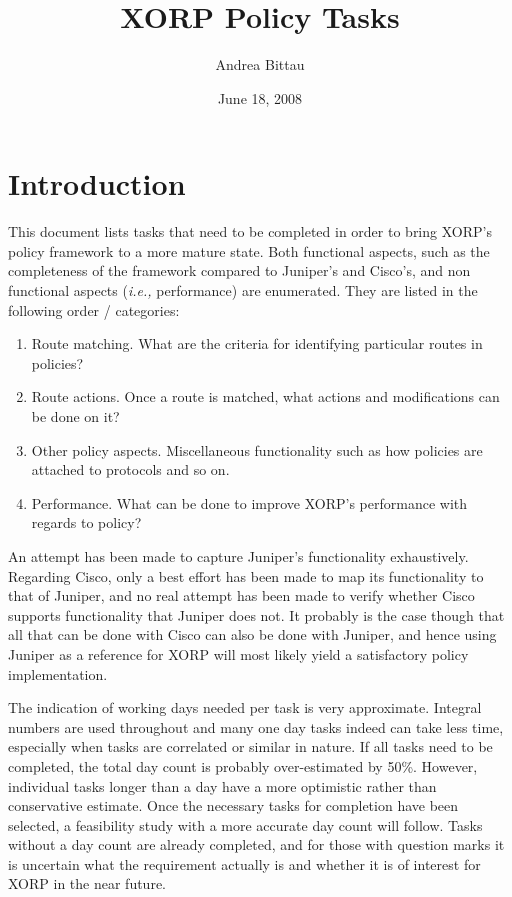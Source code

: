 \documentclass[letterpaper]{article}
\author{Andrea Bittau}
\title{XORP Policy Tasks}
\date{June 18, 2008}
\begin{document}
\maketitle

\section{Introduction}
This document lists tasks that need to be completed in order to bring XORP's
policy framework to a more mature state.  Both functional aspects, such as the
completeness of the framework compared to Juniper's and Cisco's, and non
functional aspects ({\em i.e.,} performance) are enumerated.  They are listed in
the following order / categories:
\begin{enumerate}
\item Route matching.  What are the criteria for identifying particular routes
in policies?

\item Route actions.  Once a route is matched, what actions and modifications
can be done on it?

\item Other policy aspects.  Miscellaneous functionality such as how policies
are attached to protocols and so on.

\item Performance.  What can be done to improve XORP's performance with regards
to policy?
\end{enumerate}

An attempt has been made to capture Juniper's functionality exhaustively.
Regarding Cisco, only a best effort has been made to map its functionality to
that of Juniper, and no real attempt has been made to verify whether Cisco
supports functionality that Juniper does not.  It probably is the case though
that all that can be done with Cisco can also be done with Juniper, and hence
using Juniper as a reference for XORP will most likely yield a satisfactory
policy implementation.

The indication of working days needed per task is very approximate.  Integral
numbers are used throughout and many one day tasks indeed can take less time,
especially when tasks are correlated or similar in nature.  If all tasks need to
be completed, the total day count is probably over-estimated by 50\%.  However,
individual tasks longer than a day have a more optimistic rather than
conservative estimate.  Once the necessary tasks for completion have been
selected, a feasibility study with a more accurate day count will follow.  Tasks
without a day count are already completed, and for those with question marks it
is uncertain what the requirement actually is and whether it is of interest for
XORP in the near future.
\end{document}
